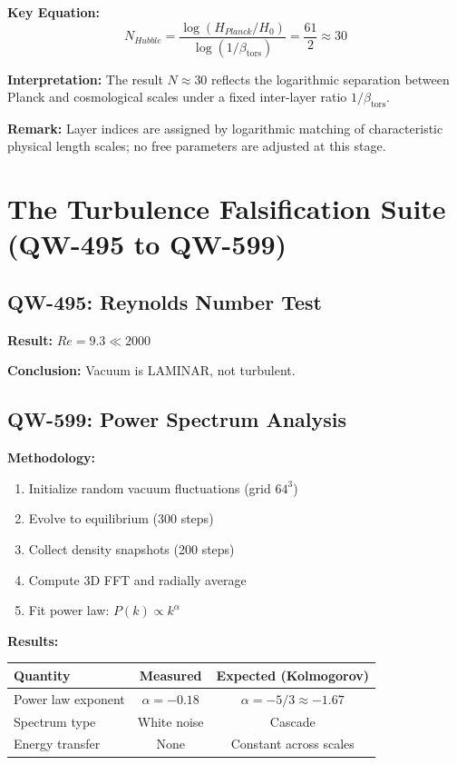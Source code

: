 \documentclass[11pt,a4paper]{book}
\theoremstyle{remark}
\newcommand{\betators}{\beta_{\text{tors}}}
\begin{document}
\textbf{Key Equation:}
\begin{equation}
N_{Hubble} = \frac{\log(H_{Planck}/H_0)}{\log(1/\betators)} = \frac{61}{2} \approx 30
\end{equation}

\textbf{Interpretation:} The result $N \approx 30$ reflects the logarithmic separation between Planck and cosmological scales under a fixed inter-layer ratio $1/\betators$.

\textbf{Remark:} Layer indices are assigned by logarithmic matching of characteristic physical length scales; no free parameters are adjusted at this stage.

\section{The Turbulence Falsification Suite (QW-495 to QW-599)}

\subsection{QW-495: Reynolds Number Test}

\textbf{Result:} $Re = 9.3 \ll 2000$

\textbf{Conclusion:} Vacuum is LAMINAR, not turbulent.

\subsection{QW-599: Power Spectrum Analysis}

\textbf{Methodology:}
\begin{enumerate}
    \item Initialize random vacuum fluctuations (grid $64^3$)
    \item Evolve to equilibrium (300 steps)
    \item Collect density snapshots (200 steps)
    \item Compute 3D FFT and radially average
    \item Fit power law: $P(k) \propto k^\alpha$
\end{enumerate}

\textbf{Results:}

\begin{center}
\begin{tabular}{|l|c|c|}
\hline
\textbf{Quantity} & \textbf{Measured} & \textbf{Expected (Kolmogorov)} \\
\hline
Power law exponent & $\alpha = -0.18$ & $\alpha = -5/3 \approx -1.67$ \\
Spectrum type & White noise & Cascade \\
Energy transfer & None & Constant across scales \\
\hline
\end{tabular}
\end{center}
\end{document}
